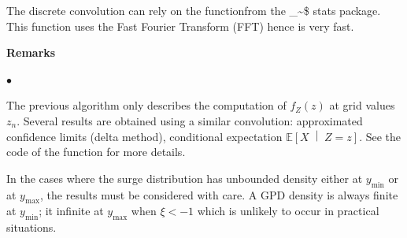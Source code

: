 \documentclass[11pt,a4paper]{report}\usepackage[]{graphicx}\usepackage[]{color}
\makeatletter
\newcommand\code{\bgroup\@makeother\_\@makeother\~\@makeother\$\@codex}
\def\@codex#1{{\normalfont\ttfamily\hyphenchar\font=-1 #1}\egroup}
\newcommand{\Esp}{\mathbb{E}}
\newcommand{\m}{\mathbf}
\newcommand{\bCond}[2]{\left[ #1 \;\middle\vert\; #2 \right]}
\newcommand{\Low}[1]{#1_{\mathrm{min}}}
\newcommand{\Up}[1]{#1_{\mathrm{max}}}
\newenvironment{remarks}
   {\medskip \par \noindent%
    \textbf{Remarks}\\\vspace{-1.5em}\nopagebreak%
    \begin{list}{$\bullet$}{%
       \setlength{\labelwidth}{-6pt}%
       \setlength{\leftmargin}{0pt}%
       \setlength{\rightmargin}{0pt}%
       \small
     }
   }%
   {\end{list} \par \noindent}
\makeatother
\begin{document}


The discrete convolution can rely on the \verb@convolve@ functionfrom
the \code{stats} package. This function uses the Fast Fourier
Transform (FFT) hence is very fast.

\begin{remarks} 
  
\item The previous algorithm only describes the computation of
  $f_Z(z)$ at grid values~$z_n$. Several results are obtained using a
  similar convolution: approximated confidence limits (delta method),
  conditional expectation $\Esp\bCond{X}{Z=z}$. See the code of the
  function \verb@convSL@ for more details.
  
\item In the cases where the surge distribution has unbounded density
  either at $\Low{y}$ or at $\Up{y}$, the results must be considered
  with care. A GPD density is always finite at $\Low{y}$; it infinite
  at $\Up{y}$ when $\xi < -1$ which is unlikely to occur in practical
  situations.
  
\end{remarks}
\end{document}
